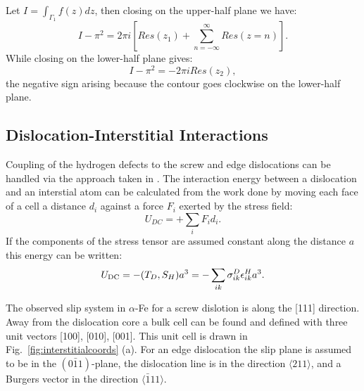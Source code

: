Let $I=\int_{\Gamma_{1}}f(z)dz$, then closing on the upper-half plane we have:
%
\begin{equation}
I-\pi^{2} = 2\pi i\left[Res(z_{1})+\sum_{n=-\infty}^{\infty}Res(z=n)\right].
\end{equation}
%
While closing on the lower-half plane gives:
%
\begin{equation}
I-\pi^{2} = -2\pi i Res(z_{2}),
\end{equation}
%
the negative sign arising because the contour goes clockwise on the lower-half plane.

\subsection{Dislocation-Interstitial Interactions}
Coupling of the hydrogen defects to the screw and edge dislocations can be
handled via the approach taken in \cite{cochardt55}.
The interaction energy between a dislocation and an interstial atom can
be calculated from the work done by moving each face of a cell a distance
$d_{i}$ against a force $F_{i}$ exerted by the stress field:
%
\begin{equation}
U_{DC} =+\sum_{i}F_{i}d_{i}.
\end{equation}
%
If the components of the stress tensor are assumed constant along the distance $a$
this energy can be written:
%
\begin{equation}
U_{\rm{DC}} = -(T_{D},S_{H})a^{3}= -\sum_{ik} \sigma_{ik}^{D}\epsilon^{H}_{ik} a^{3}.
\end{equation}
%

The observed slip system in $\alpha$-Fe for a screw dislotion is along the [111]
direction. Away from the dislocation core a bulk cell can be found and defined
with three unit vectors [100], [010], [001]. This unit cell is drawn in
Fig.~\ref{fig:interstitialcoords} (a). For an edge dislocation the slip plane is
assumed to be in the $(0\bar{1}1)$-plane, the dislocation line is in the direction
$\langle 211 \rangle$, and a Burgers vector in the direction $\langle \bar{1}11 \rangle$.

